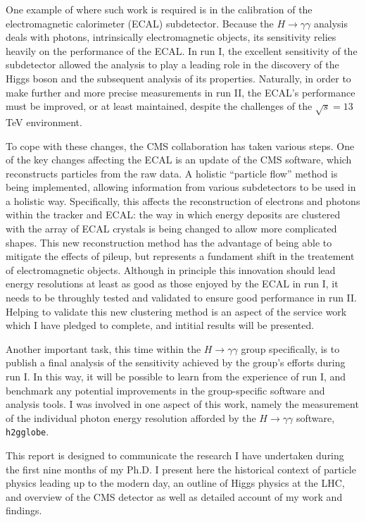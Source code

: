 \documentclass[10pt]{article}
\begin{document}
One example of where such work is required is in the calibration of the electromagnetic calorimeter (ECAL) subdetector. Because the $H \rightarrow \gamma \gamma$ analysis deals with photons, intrinsically electromagnetic objects, its sensitivity relies heavily on the performance of the ECAL. In run I, the excellent sensitivity of the subdetector allowed the analysis to play a  leading role in the discovery of the Higgs boson and the subsequent analysis of its properties. Naturally, in order to make further and more precise measurements in run II, the ECAL's performance must be improved, or at least maintained, despite the challenges of the $\sqrt{s} = 13$TeV environment.

To cope with these changes, the CMS collaboration has taken various steps. One of the key changes affecting the ECAL is an update of the CMS software, which reconstructs particles from the raw data. A holistic ``particle flow'' method is being implemented, allowing information from various subdetectors to be used in a holistic way. Specifically, this affects the reconstruction of electrons and photons within the tracker and ECAL: the way in which energy deposits are clustered with the array of ECAL crystals is being changed to allow more complicated shapes. This new reconstruction method has the advantage of being able to mitigate the effects of pileup, but represents a fundament shift in the treatement of electromagnetic objects. Although in principle this innovation should lead energy resolutions at least as good as those enjoyed by the ECAL in run I, it needs to be throughly tested and validated to ensure good performance in run II. Helping to validate this new clustering method is an aspect of the service work which I have pledged to complete, and intitial results will be presented.

Another important task, this time within the $H \rightarrow \gamma \gamma$ group specifically, is to publish a final analysis of the sensitivity achieved by the group's efforts during run I. In this way, it will be possible to learn from the experience of run I, and benchmark any potential improvements in the group-specific software and analysis tools. I was involved in one aspect of this work, namely the measurement of the individual photon energy resolution afforded by the $H \rightarrow \gamma \gamma$ software, \texttt{h2gglobe}. 

 This report is designed to communicate the research I have undertaken during the first nine months of my Ph.D. I present here the historical context of particle physics leading up to the modern day, an outline of Higgs physics at the LHC, and overview of the CMS detector as well as detailed account of my work and findings.
\end{document}
